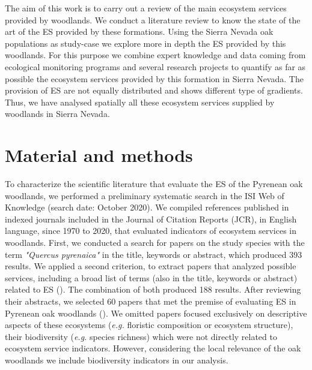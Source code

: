 The aim of this work is to carry out a review of the main ecosystem services provided by \Qp woodlands. We conduct a literature review to know the state of the art of the ES provided by these formations. Using the Sierra Nevada oak populations as study-case we explore more in depth the ES provided by this woodlands. For this purpose we combine expert knowledge and data coming from ecological monitoring programs and several research projects to quantify as far as possible the ecosystem services provided by this formation in Sierra Nevada. The provision of ES are not equally distributed and shows different type of gradients. Thus, we have analysed spatially all these ecosystem services supplied by \Qpy woodlands in Sierra Nevada.

\section{Material and methods}\label{sec:es:mat}

To characterize the scientific literature that evaluate the ES of the Pyrenean oak woodlands, we performed a preliminary systematic search in the ISI Web of Knowledge (search date: October 2020). We compiled references published in indexed journals included in the Journal of Citation Reports (JCR), in English language, since 1970 to 2020, that evaluated indicators of ecosystem services in \Qp woodlands. First, we conducted a search for papers on the study species with the term \emph{"Quercus pyrenaica"} in the title, keywords or abstract, which produced 393 results. We applied a second criterion, to extract papers that analyzed possible services, including a broad list of terms (also in the title, keywords or abstract) related to ES (). The combination of both produced 188 results. After reviewing their abstracts, we selected 60 papers that met the premise of evaluating ES in Pyrenean oak woodlands (). We omitted papers focused exclusively on descriptive aspects of these ecosystems (\emph{e.g.} floristic composition or ecosystem structure), their biodiversity (\emph{e.g.} species richness) which were not directly related to ecosystem service indicators. However, considering the local relevance of the \Qp oak woodlands we include biodiversity indicators in our analysis. 


